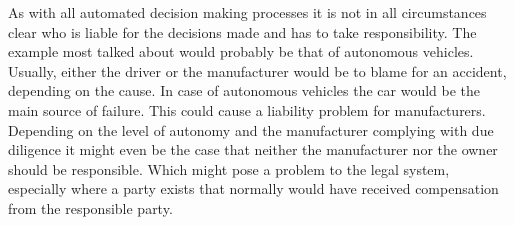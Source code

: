 As with all automated decision making processes 
it is not in all circumstances clear who is liable for 
the decisions made and has to take responsibility.
The example most talked about would probably be 
that of autonomous vehicles. Usually, either the driver or the manufacturer would be to blame for an accident, depending on the cause. In case of autonomous vehicles the car would be the main source of failure. This could cause a liability problem for manufacturers.   
Depending on the level of autonomy and the manufacturer complying with due diligence it might even be the case that neither the manufacturer nor the owner should be responsible. Which might pose a problem to the legal system, especially where a party exists that normally would have received compensation from the responsible party.
